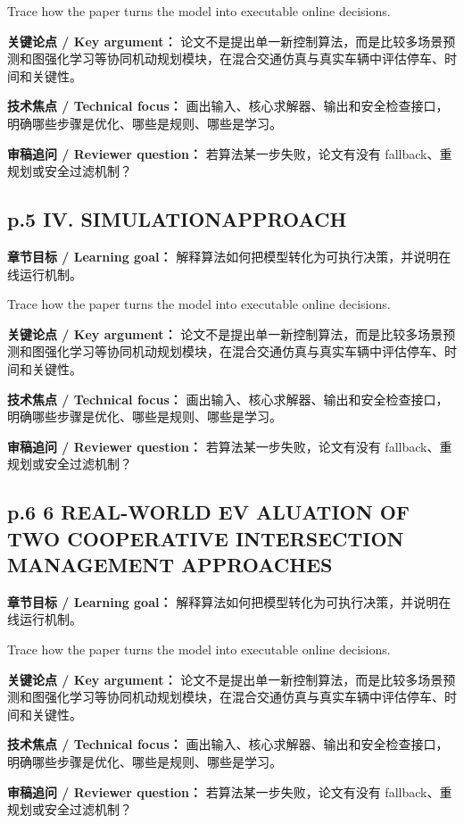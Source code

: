\documentclass[UTF8,a4paper,11pt,fontset=fandol]{ctexart}
\begin{document}
Trace how the paper turns the model into executable online decisions.

\textbf{关键论点 / Key argument：} 论文不是提出单一新控制算法，而是比较多场景预测和图强化学习等协同机动规划模块，在混合交通仿真与真实车辆中评估停车、时间和关键性。

\textbf{技术焦点 / Technical focus：} 画出输入、核心求解器、输出和安全检查接口，明确哪些步骤是优化、哪些是规则、哪些是学习。

\textbf{审稿追问 / Reviewer question：} 若算法某一步失败，论文有没有 fallback、重规划或安全过滤机制？

\subsection*{p.5 IV. SIMULATIONAPPROACH}
\textbf{章节目标 / Learning goal：} 解释算法如何把模型转化为可执行决策，并说明在线运行机制。

Trace how the paper turns the model into executable online decisions.

\textbf{关键论点 / Key argument：} 论文不是提出单一新控制算法，而是比较多场景预测和图强化学习等协同机动规划模块，在混合交通仿真与真实车辆中评估停车、时间和关键性。

\textbf{技术焦点 / Technical focus：} 画出输入、核心求解器、输出和安全检查接口，明确哪些步骤是优化、哪些是规则、哪些是学习。

\textbf{审稿追问 / Reviewer question：} 若算法某一步失败，论文有没有 fallback、重规划或安全过滤机制？

\subsection*{p.6 6 REAL-WORLD EV ALUATION OF TWO COOPERATIVE INTERSECTION MANAGEMENT APPROACHES}
\textbf{章节目标 / Learning goal：} 解释算法如何把模型转化为可执行决策，并说明在线运行机制。

Trace how the paper turns the model into executable online decisions.

\textbf{关键论点 / Key argument：} 论文不是提出单一新控制算法，而是比较多场景预测和图强化学习等协同机动规划模块，在混合交通仿真与真实车辆中评估停车、时间和关键性。

\textbf{技术焦点 / Technical focus：} 画出输入、核心求解器、输出和安全检查接口，明确哪些步骤是优化、哪些是规则、哪些是学习。

\textbf{审稿追问 / Reviewer question：} 若算法某一步失败，论文有没有 fallback、重规划或安全过滤机制？
\end{document}
